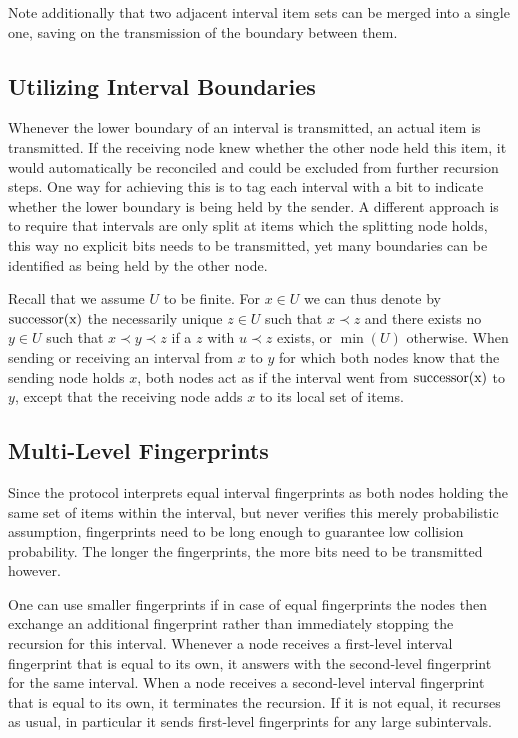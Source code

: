 Note additionally that two adjacent interval item sets can be merged into a single one, saving on the transmission of the boundary between them.

\subsection{Utilizing Interval Boundaries}

Whenever the lower boundary of an interval is transmitted, an actual item is transmitted. If the receiving node knew whether the other node held this item, it would automatically be reconciled and could be excluded from further recursion steps. One way for achieving this is to tag each interval with a bit to indicate whether the lower boundary is being held by the sender. A different approach is to require that intervals are only split at items which the splitting node holds, this way no explicit bits needs to be transmitted, yet many boundaries can be identified as being held by the other node.

Recall that we assume $U$ to be finite. For $x \in U$ we can thus denote by $\operatorname{successor({x})}$ the necessarily unique $z \in U$ such that $x \prec z$ and there exists no $y \in U$ such that $x \prec y \prec z$ if a $z$ with $u \prec z$ exists, or $\min(U)$ otherwise. When sending or receiving an interval from $x$ to $y$ for which both nodes know that the sending node holds $x$, both nodes act as if the interval went from $\operatorname{successor({x})}$ to $y$, except that the receiving node adds $x$ to its local set of items.

\subsection{Multi-Level Fingerprints}

Since the protocol interprets equal interval fingerprints as both nodes holding the same set of items within the interval, but never verifies this merely probabilistic assumption, fingerprints need to be long enough to guarantee low collision probability. The longer the fingerprints, the more bits need to be transmitted however.

One can use smaller fingerprints if in case of equal fingerprints the nodes then exchange an additional fingerprint rather than immediately stopping the recursion for this interval. Whenever a node receives a first-level interval fingerprint that is equal to its own, it answers with the second-level fingerprint for the same interval. When a node receives a second-level interval fingerprint that is equal to its own, it terminates the recursion. If it is not equal, it recurses as usual, in particular it sends first-level fingerprints for any large subintervals.

